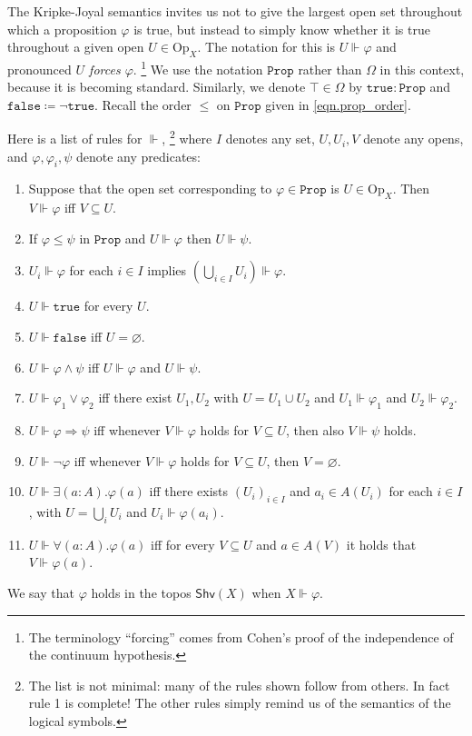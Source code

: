 \documentclass[11pt, oneside, article]{memoir}
\theoremstyle{plain}
\theoremstyle{definition}
\theoremstyle{remark}
\renewcommand{\ss}{\subseteq}
\newcommand{\const}[1]{\mathtt{#1}}
\newcommand{\Set}[1]{\mathrm{#1}}
\newcommand{\Fun}[1]{\mathsf{#1}}
\newcommand{\forces}{\Vdash}
\newcommand{\shv}{\Fun{Shv}}
\newcommand{\prop}{\const{Prop}}
\newcommand{\Op}{\Set{Op}}
\newcommand{\imp}{\Rightarrow}
\newcommand{\true}{\const{true}}
\newcommand{\false}{\const{false}}
\begin{document}
The Kripke-Joyal semantics invites us not to give the largest open set throughout which a proposition $\varphi$ is true, but instead to simply know whether it is true throughout a given open $U\in\Op_X$. The notation for this is $U\forces\varphi$ and pronounced \emph{$U$ forces $\varphi$}.%
\footnote{The terminology ``forcing'' comes from Cohen's proof of the independence of the continuum hypothesis.}
We use the notation $\prop$ rather than $\Omega$ in this context, because it is becoming standard. Similarly, we denote $\top\in\Omega$ by $\true:\prop$ and $\false\coloneqq\neg\true$. Recall the order $\leq$ on $\prop$ given in \eqref{eqn.prop_order}.

Here is a list of rules for $\forces$,%
\footnote{The list is not minimal: many of the rules shown follow from others. In fact rule 1 is complete! The other rules simply remind us of the semantics of the logical symbols.
}
where $I$ denotes any set, $U, U_i, V$ denote any opens, and $\varphi,\varphi_i,\psi$ denote any predicates:
\begin{enumerate}
	\item Suppose that the open set corresponding to $\varphi\in\prop$ is $U\in\Op_X$. Then $V\forces\varphi$ iff $V\ss U$.
  \item If $\varphi\leq\psi$ in $\prop$ and $U\forces\varphi$ then $U\forces\psi$.
  \item $U_i\forces\varphi$ for each $i\in I$ implies $\left(\bigcup_{i\in I}U_i\right)\forces\varphi$.
  \item $U\forces\true$ for every $U$.
  \item $U\forces\false$ iff $U=\varnothing$.
  \item $U\forces\varphi\wedge\psi$ iff $U\forces\varphi$ and $U\forces\psi$.
  \item $U\forces\varphi_1\vee\varphi_2$ iff there exist $U_1,U_2$ with $U=U_1\cup U_2$ and $U_1\forces\varphi_1$ and $U_2\forces\varphi_2$.
  \item $U\forces \varphi\imp\psi$ iff whenever $V\forces\varphi$ holds for $V\ss U$, then also $V\forces\psi$ holds.
  \item $U\forces\neg\varphi$ iff whenever $V\forces\varphi$ holds for $V\ss U$, then $V=\varnothing$.
  \item $U\forces\exists (a:A).\varphi(a)$ iff there exists $(U_i)_{i\in I}$ and $a_i\in A(U_i)$ for each $i\in I$, with $U=\bigcup_iU_i$ and $U_i\forces\varphi(a_i)$.
  \item $U\forces\forall (a:A).\varphi(a)$ iff for every $V\ss U$ and $a\in A(V)$ it holds that $V\forces \varphi(a)$.
\end{enumerate}
We say that $\varphi$ holds in the topos $\shv(X)$ when $X\forces\varphi$.
\end{document}
